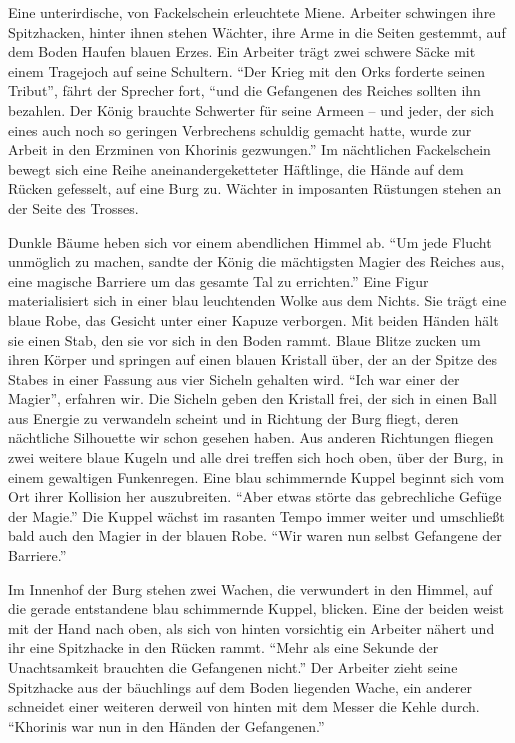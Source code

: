 \documentclass[a5paper,pagesize,numbers=noenddot]{scrbook}
\begin{document}
Eine unterirdische, von Fackelschein erleuchtete Miene.
Arbeiter schwingen ihre Spitzhacken, hinter ihnen stehen Wächter, ihre Arme in die Seiten gestemmt, auf dem Boden Haufen blauen Erzes.
Ein Arbeiter trägt zwei schwere Säcke mit einem Tragejoch auf seine Schultern.
\enquote{Der Krieg mit den Orks forderte seinen Tribut}, fährt der Sprecher fort, \enquote{und die Gefangenen des Reiches sollten ihn bezahlen.
Der König brauchte Schwerter für seine Armeen -- und jeder, der sich eines auch noch so geringen Verbrechens schuldig gemacht hatte, wurde zur Arbeit in den Erzminen von Khorinis gezwungen.}
Im nächtlichen Fackelschein bewegt sich eine Reihe aneinandergeketteter Häftlinge, die Hände auf dem Rücken gefesselt, auf eine Burg zu.
Wächter in imposanten Rüstungen stehen an der Seite des Trosses.

Dunkle Bäume heben sich vor einem abendlichen Himmel ab.
\enquote{Um jede Flucht unmöglich zu machen, sandte der König die mächtigsten Magier des Reiches aus, eine magische Barriere um das gesamte Tal zu errichten.}
Eine Figur materialisiert sich in einer blau leuchtenden Wolke aus dem Nichts.
Sie trägt eine blaue Robe, das Gesicht unter einer Kapuze verborgen.
Mit beiden Händen hält sie einen Stab, den sie vor sich in den Boden rammt.
Blaue Blitze zucken um ihren Körper und springen auf einen blauen Kristall über, der an der Spitze des Stabes in einer Fassung aus vier Sicheln gehalten wird.
\enquote{Ich war einer der Magier}, erfahren wir.
Die Sicheln geben den Kristall frei, der sich in einen Ball aus Energie zu verwandeln scheint und in Richtung der Burg fliegt, deren nächtliche Silhouette wir schon gesehen haben.
Aus anderen Richtungen fliegen zwei weitere blaue Kugeln und alle drei treffen sich hoch oben, über der Burg, in einem gewaltigen Funkenregen.
Eine blau schimmernde Kuppel beginnt sich vom Ort ihrer Kollision her auszubreiten.
\enquote{Aber etwas störte das gebrechliche Gefüge der Magie.}
Die Kuppel wächst im rasanten Tempo immer weiter und umschließt bald auch den Magier in der blauen Robe.
\enquote{Wir waren nun selbst Gefangene der Barriere.}

Im Innenhof der Burg stehen zwei Wachen, die verwundert in den Himmel, auf die gerade entstandene blau schimmernde Kuppel, blicken.
Eine der beiden weist mit der Hand nach oben, als sich von hinten vorsichtig ein Arbeiter nähert und ihr eine Spitzhacke in den Rücken rammt.
\enquote{Mehr als eine Sekunde der Unachtsamkeit brauchten die Gefangenen nicht.}
Der Arbeiter zieht seine Spitzhacke aus der bäuchlings auf dem Boden liegenden Wache, ein anderer schneidet einer weiteren derweil von hinten mit dem Messer die Kehle durch.
\enquote{Khorinis war nun in den Händen der Gefangenen.}
\end{document}
